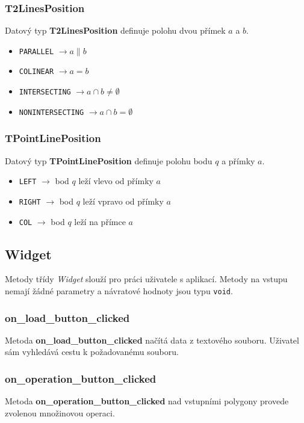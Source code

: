 \documentclass[a4paper, 12pt]{article}
\begin{document}
\subsubsection*{T2LinesPosition}
Datový typ \textbf{T2LinesPosition} definuje polohu dvou přímek $a$ a $b$.\\  
\begin{itemize}
\item \texttt{PARALLEL} $\rightarrow a \parallel b$
\item \texttt{COLINEAR} $\rightarrow a = b$
\item \texttt{INTERSECTING} $\rightarrow a \cap b \neq \emptyset$
\item \texttt{NONINTERSECTING} $\rightarrow a \cap b = \emptyset$
\end{itemize}

\subsubsection*{TPointLinePosition}
Datový typ \textbf{TPointLinePosition} definuje polohu bodu $q$ a přímky $a$.\\   
\begin{itemize}
\item \texttt{LEFT} $\rightarrow$ bod $q$ leží vlevo od přímky $a$
\item \texttt{RIGHT} $\rightarrow$ bod $q$ leží vpravo od přímky $a$
\item \texttt{COL} $\rightarrow$ bod $q$ leží na přímce $a$
\end{itemize}




\subsection{Widget}
Metody třídy \textit{Widget} slouží pro práci uživatele s aplikací. Metody na vstupu nemají žádné parametry a návratové hodnoty jsou typu \texttt{void}.

\subsubsection*{on\_load\_button\_clicked}
Metoda \textbf{on\_load\_button\_clicked} načítá data z textového souboru. Uživatel sám vyhledává cestu k požadovanému souboru.

\subsubsection*{on\_operation\_button\_clicked}
Metoda \textbf{on\_operation\_button\_clicked} nad vstupními polygony provede zvolenou mno\-ži\-no\-vou operaci.
\end{document}

